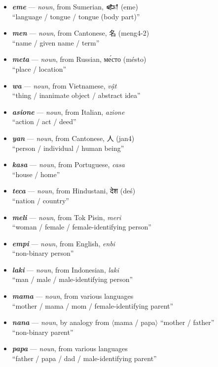 \documentclass[a4paper]{article}
\begin{document}
\begin{itemize}
	\item \textbf{\textit{eme}} — \textit{noun}, from Sumerian, {\cuneiffont 𒅴} (eme) \\``language / tongue / tongue (body part)''
	\item \textbf{\textit{men}} — \textit{noun}, from Cantonese, 名 (meng4-2) \\``name / given name / term''
	\item \textbf{\textit{meta}} — \textit{noun}, from Russian, ме́сто (mésto) \\``place / location''
	\item \textbf{\textit{wa}} — \textit{noun}, from Vietnamese, \textit{vật} \\``thing / inanimate object / abstract idea''
	\item \textbf{\textit{asione}} — \textit{noun}, from Italian, \textit{azione} \\``action / act / deed''
	\item \textbf{\textit{yan}} — \textit{noun}, from Cantonese, 人 (jan4) \\``person / individual / human being''
	\item \textbf{\textit{kasa}} — \textit{noun}, from Portuguese, \textit{casa} \\``house / home''
	\item \textbf{\textit{teca}} — \textit{noun}, from Hindustani, {\hmfont देश} (deś) \\``nation / country''
	\item \textbf{\textit{meli}} — \textit{noun}, from Tok Pisin, \textit{meri} \\``woman / female / female-identifying person''
	\item \textbf{\textit{empi}} — \textit{noun}, from English, \textit{enbi} \\``non-binary person''
	\item \textbf{\textit{laki}} — \textit{noun}, from Indonesian, \textit{laki} \\``man / male / male-identifying person''
	\item \textbf{\textit{mama}} — \textit{noun}, from various languages \\``mother / mama / mom / female-identifying parent''
	\item \textbf{\textit{nana}} — \textit{noun}, by analogy from $\langle$mama / papa$\rangle$ ``mother / father'' \\``non-binary parent''
	\item \textbf{\textit{papa}} — \textit{noun}, from various languages \\``father / papa / dad / male-identifying parent''

\end{itemize}
\end{document}
